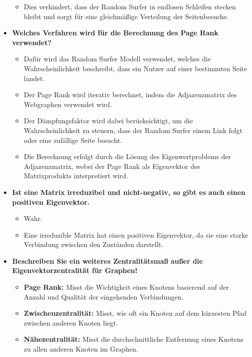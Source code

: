 \documentclass[12pt]{scrartcl}
\begin{document}
\begin{itemize}
\begin{itemize}
              \item Dies verhindert, dass der Random Surfer in endlosen Schleifen stecken bleibt und sorgt für eine gleichmäßige Verteilung der Seitenbesuche.
          \end{itemize}
    \item \textbf{Welches Verfahren wird für die Berechnung des Page Rank verwendet?}
          \begin{itemize}
              \item Dafür wird das Random Surfer Modell verwendet, welches die Wahrscheinlichkeit beschreibt, dass ein Nutzer auf einer bestimmten Seite landet.
              \item Der Page Rank wird iterativ berechnet, indem die Adjazenzmatrix des Webgraphen verwendet wird.
              \item Der Dämpfungsfaktor wird dabei berücksichtigt, um die Wahrscheinlichkeit zu steuern, dass der Random Surfer einem Link folgt oder eine zufällige Seite besucht.
              \item Die Berechnung erfolgt durch die Lösung des Eigenwertproblems der Adjazenzmatrix, wobei der Page Rank als Eigenvektor des Matrixprodukts interpretiert wird.
          \end{itemize}
          \pagebreak
    \item \textbf{Ist eine Matrix irreduzibel und nicht-negativ, so gibt es auch einen positiven Eigenvektor.}
          \begin{itemize}
              \item Wahr.
              \item Eine irreduzible Matrix hat einen positiven Eigenvektor, da sie eine starke Verbindung zwischen den Zuständen darstellt.
          \end{itemize}
    \item \textbf{Beschreiben Sie ein weiteres Zentralitätsmaß außer die Eigenvektorzentralität für Graphen!}
          \begin{itemize}
              \item \textbf{Page Rank:} Misst die Wichtigkeit eines Knotens basierend auf der Anzahl und Qualität der eingehenden Verbindungen.
              \item \textbf{Zwischenzentralität:} Misst, wie oft ein Knoten auf dem kürzesten Pfad zwischen anderen Knoten liegt.
              \item \textbf{Nähezentralität:} Misst die durchschnittliche Entfernung eines Knotens zu allen anderen Knoten im Graphen.

\end{itemize}
\end{itemize}
\end{document}
